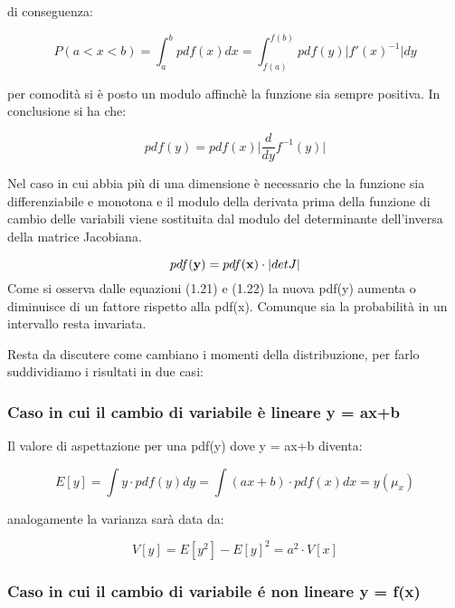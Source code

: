 di conseguenza:

\begin{equation*}
	P(a < x< b) = \int_{a}^{b}{pdf(x)dx} = \int_{f(a)}^{f(b)}{pdf(y)\vert f'(x)^{-1}\vert dy}
\end{equation*}

per comodit\`{a} si \`{e} posto un modulo affinch\`{e} la funzione sia sempre positiva. In conclusione si ha che:

\begin{equation}
	pdf(y) = pdf(x)\vert \dfrac{d}{dy}f^{-1}(y) \vert
\end{equation}
 
 Nel caso in cui abbia pi\`{u} di una dimensione \`{e} necessario che la funzione sia differenziabile e monotona e il modulo della derivata prima della funzione di cambio delle variabili viene sostituita dal modulo del determinante dell'inversa della matrice Jacobiana.
 
 \begin{equation}
 	pdf(\bold{y}) = pdf(\bold{x}) \cdot \vert detJ \vert
 \end{equation}
\newline
\noindent Come si osserva dalle equazioni (1.21) e (1.22) la nuova pdf(y) aumenta o diminuisce di un fattore rispetto alla pdf(x). Comunque sia la probabilit\`{a} in un intervallo resta invariata.

Resta da discutere come cambiano i momenti della distribuzione, per farlo suddividiamo i risultati in due casi:

\subsubsection{Caso in cui il cambio di variabile \`{e} lineare y = ax+b}

Il valore di aspettazione per una pdf(y) dove y = ax+b diventa:

\begin{equation}
	E[y] = \int{y\cdot pdf(y)dy} = \int{(ax+b) \cdot pdf(x)dx = y(\mu_x)}
\end{equation}
 
 analogamente la varianza sar\`{a} data da:
 
 \begin{equation}
 	V[y] = E[y^2] - E[y]^2 = a^2 \cdot V[x]
 \end{equation}

 \subsubsection{Caso in cui il cambio di variabile \'{e} non lineare y = f(x)}
 
